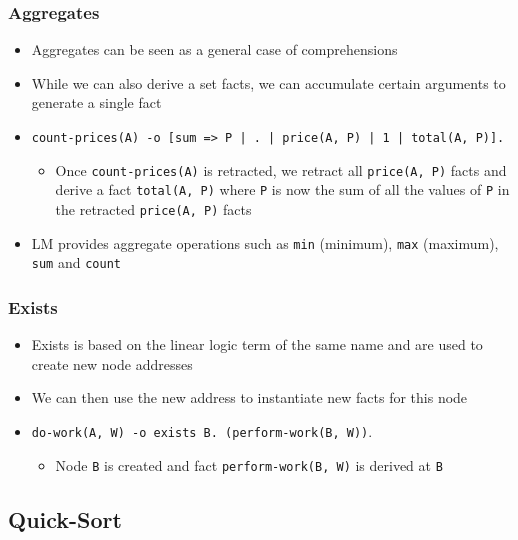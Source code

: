 \documentclass{beamer}
\begin{document}
\begin{frame}[fragile]
   \frametitle{Aggregates}
   \begin{itemize}
      \item Aggregates can be seen as a general case of comprehensions
      \item While we can also derive a set facts, we can accumulate certain arguments to generate a single fact
      \item {\footnotesize \texttt{count-prices(A) -o [sum => P | . | price(A, P) | 1 | total(A, P)].}}
      \begin{itemize}
         \item Once \texttt{count-prices(A)} is retracted, we retract all \texttt{price(A, P)} facts and derive a fact \texttt{total(A, P)} where \texttt{P} is now the sum of all the values of \texttt{P} in the retracted \texttt{price(A, P)} facts
      \end{itemize}
      \item LM provides aggregate operations such as \texttt{min} (minimum), \texttt{max} (maximum), \texttt{sum} and \texttt{count}
   \end{itemize}
\end{frame}

\begin{frame}[fragile]
   \frametitle{Exists}
   \begin{itemize}
      \item Exists is based on the linear logic term of the same name and are used to create new node addresses
      \item We can then use the new address to instantiate new facts for this node
      \item \texttt{do-work(A, W) -o exists B. (perform-work(B, W))}.
      \begin{itemize}
         \item Node \texttt{B} is created and fact \texttt{perform-work(B, W)} is derived at \texttt{B}
      \end{itemize}
   \end{itemize}
\end{frame}

\subsection{Quick-Sort}
\end{document}
